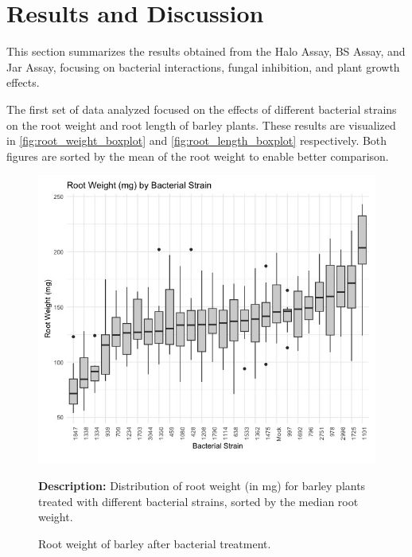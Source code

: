 \section{Results and Discussion}

This section summarizes the results obtained from the Halo Assay, BS Assay, and Jar Assay, focusing on bacterial interactions, fungal inhibition, and plant growth effects.

\par
The first set of data analyzed focused on the effects of different bacterial strains on the root weight and root length of barley plants. These results are visualized in \autoref{fig:root_weight_boxplot} and \autoref{fig:root_length_boxplot} respectively.
Both figures are sorted by the mean of the root weight to enable better comparison. 


\begin{figure}[H]
    \centering
    \includegraphics[width=0.8\linewidth]{Figures/Root Weight.jpeg}
    \caption{Root weight of barley after bacterial treatment.}
    \medskip
    \textbf{Description:} Distribution of root weight (in mg) for barley plants treated with different bacterial strains, sorted by the median root weight.
    \label{fig:root_weight_boxplot}
\end{figure}%

